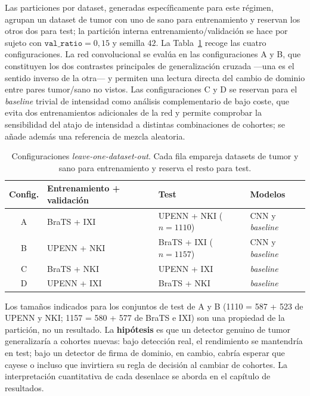 Las particiones por dataset, generadas específicamente para este régimen,
agrupan un dataset de tumor con uno de sano para entrenamiento y reservan los
otros dos para test; la partición interna entrenamiento/validación se hace por
sujeto con $\texttt{val\_ratio}=0{,}15$ y semilla $42$. La
Tabla~\ref{tab:lodo} recoge las cuatro configuraciones. La red convolucional se
evalúa en las configuraciones A y B, que constituyen los dos contrastes
principales de generalización cruzada ---una es el sentido inverso de la otra---
y permiten una lectura directa del cambio de dominio entre pares tumor/sano no
vistos. Las configuraciones C y D se reservan para el \emph{baseline} trivial de
intensidad como análisis complementario de bajo coste, que evita dos
entrenamientos adicionales de la red y permite comprobar la sensibilidad del
atajo de intensidad a distintas combinaciones de cohortes; se añade además una
referencia de mezcla aleatoria.

\begin{table}[ht]
  \centering
  \caption[Configuraciones de validación cruzada LODO]{Configuraciones
  \emph{leave-one-dataset-out}. Cada fila empareja datasets de tumor y sano para
  entrenamiento y reserva el resto para test.}
  \label{tab:lodo}
  \begin{tabular}{c l l l}
    \hline
    \textbf{Config.} & \textbf{Entrenamiento + validación} & \textbf{Test} & \textbf{Modelos} \\
    \hline
    A & BraTS + IXI          & UPENN + NKI ($n=1110$) & CNN y \emph{baseline} \\
    B & UPENN + NKI          & BraTS + IXI ($n=1157$) & CNN y \emph{baseline} \\
    C & BraTS + NKI          & UPENN + IXI            & \emph{baseline} \\
    D & UPENN + IXI          & BraTS + NKI            & \emph{baseline} \\
    \hline
  \end{tabular}
\end{table}

Los tamaños indicados para los conjuntos de test de A y B (1110 = 587 + 523 de
UPENN y NKI; 1157 = 580 + 577 de BraTS e IXI) son una propiedad de la
partición, no un resultado. La \textbf{hipótesis} es que un detector genuino de
tumor generalizaría a cohortes nuevas: bajo detección real, el rendimiento se
mantendría en test; bajo un detector de firma de dominio, en cambio, cabría
esperar que cayese o incluso que invirtiera su regla de decisión al cambiar de
cohortes. La interpretación cuantitativa de cada desenlace se aborda en el
capítulo de resultados.

